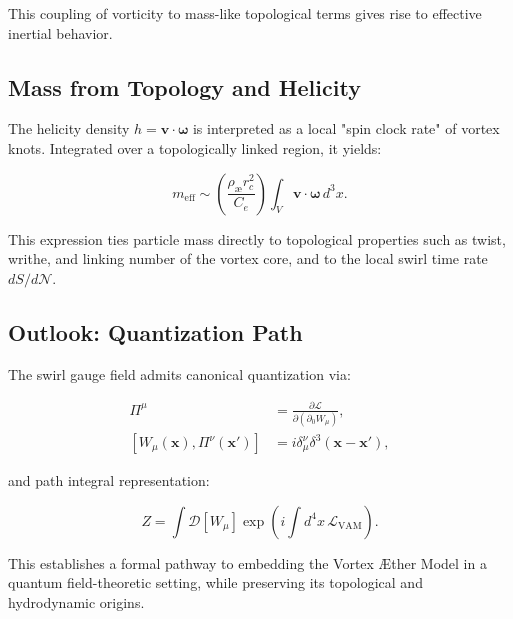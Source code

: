 This coupling of vorticity to mass-like topological terms gives rise to effective inertial behavior.

\subsection{Mass from Topology and Helicity}

The helicity density $h = \mathbf{v} \cdot \boldsymbol{\omega}$ is interpreted as a local "spin clock rate" of vortex knots. Integrated over a topologically linked region, it yields:

\begin{equation}
m_{\text{eff}} \sim \left( \frac{\rho_{\text{\ae}} r_c^2}{C_e} \right) \int_V \mathbf{v} \cdot \boldsymbol{\omega} \, d^3x.
\end{equation}

This expression ties particle mass directly to topological properties such as twist, writhe, and linking number of the vortex core, and to the local swirl time rate $dS/d\mathcal{N}$.

\subsection{Outlook: Quantization Path}

The swirl gauge field admits canonical quantization via:

\begin{align}
\Pi^\mu &= \frac{\partial \mathcal{L}}{\partial (\partial_0 W_\mu)}, \\
[W_\mu(\mathbf{x}), \Pi^\nu(\mathbf{x}')] &= i \delta^\nu_\mu \delta^3(\mathbf{x} - \mathbf{x}'),
\end{align}

and path integral representation:

\begin{equation}
Z = \int \mathcal{D}[W_\mu] \exp\left(i \int d^4x \, \mathcal{L}_{\text{VAM}}\right).
\end{equation}

This establishes a formal pathway to embedding the Vortex \AE{}ther Model in a quantum field-theoretic setting, while preserving its topological and hydrodynamic origins.
